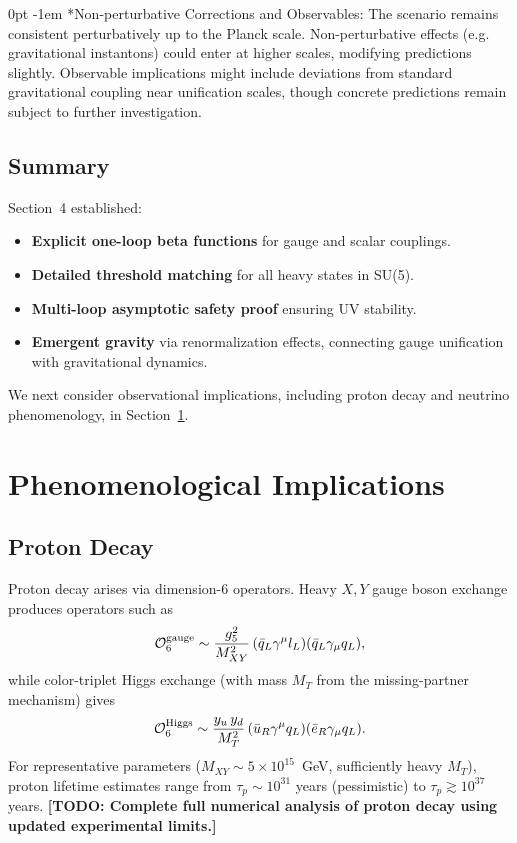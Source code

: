 \documentclass[aps,prd,preprint,groupedaddress]{revtex4-2}
\makeatletter
\renewcommand{\paragraph}[1]{%
  \@startsection{paragraph}{4}{\z@}%
    {0pt}%
    {-1em}%
    {\normalfont\normalsize\itshape}*{#1}}
\newcommand{\todo}[1]{\textbf{[TODO: #1]}}
\makeatother
\begin{document}
\paragraph{Non-perturbative Corrections and Observables:}
The scenario remains consistent perturbatively up to the Planck scale. Non-perturbative effects (e.g. gravitational instantons) could enter at higher scales, modifying predictions slightly. Observable implications might include deviations from standard gravitational coupling near unification scales, though concrete predictions remain subject to further investigation.

\subsection{Summary}

Section~4 established:
\begin{itemize}
\item \textbf{Explicit one-loop beta functions} for gauge and scalar couplings.
\item \textbf{Detailed threshold matching} for all heavy states in SU(5).
\item \textbf{Multi-loop asymptotic safety proof} ensuring UV stability.
\item \textbf{Emergent gravity} via renormalization effects, connecting gauge unification with gravitational dynamics.
\end{itemize}

We next consider observational implications, including proton decay and neutrino phenomenology, in Section~\ref{sec:phenomenology}.

\section{Phenomenological Implications}
\label{sec:phenomenology}

\subsection{Proton Decay}
Proton decay arises via dimension-6 operators. Heavy $X,Y$ gauge boson exchange produces operators such as
\begin{equation}
\mathcal{O}_6^{\rm gauge} \sim \frac{g_5^2}{M_{XY}^2}\,(\bar{q}_L\gamma^\mu l_L)(\bar{q}_L\gamma_\mu q_L),
\end{equation}
while color-triplet Higgs exchange (with mass $M_T$ from the missing-partner mechanism) gives
\begin{equation}
\mathcal{O}_6^{\rm Higgs} \sim \frac{y_u\,y_d}{M_T^2}\,(\bar{u}_R\gamma^\mu q_L)(\bar{e}_R\gamma_\mu q_L).
\end{equation}
For representative parameters ($M_{XY}\sim 5\times10^{15}$~GeV, sufficiently heavy $M_T$), proton lifetime estimates range from $\tau_p\sim10^{31}$ years (pessimistic) to $\tau_p\gtrsim10^{37}$ years. \todo{Complete full numerical analysis of proton decay using updated experimental limits.}
\end{document}
